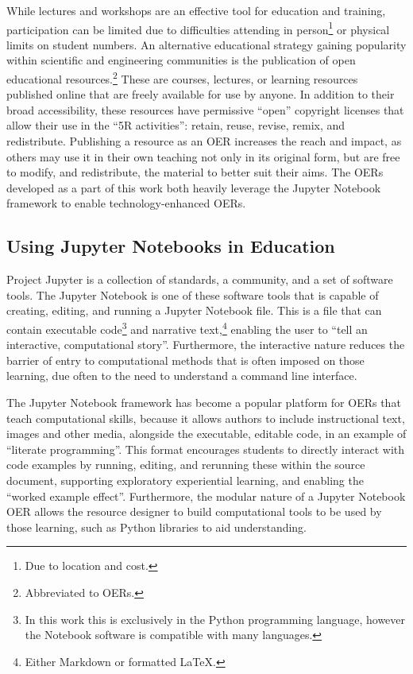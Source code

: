 While lectures and workshops are an effective tool for education and training, participation can be limited due to difficulties attending in person\footnote{Due to location and cost.} or physical limits on student numbers.
An alternative educational strategy gaining popularity within scientific and engineering communities is the publication of open educational resources.\footnote{Abbreviated to OERs.} These are courses, lectures, or learning resources published online that are freely available for use by anyone.
In addition to their broad accessibility, these resources have permissive ``open'' copyright licenses that allow their use in the ``5R activities'': retain, reuse, revise, remix, and redistribute.\autocite{wiley_open_nodate}
Publishing a resource as an OER increases the reach and impact, as others may use it in their own teaching not only in its original form, but are free to modify, and redistribute, the material to better suit their aims.
The OERs developed as a part of this work both heavily leverage the Jupyter Notebook framework\autocite{kluyver_jupyter_2016} to enable technology-enhanced OERs.

\subsection{Using Jupyter Notebooks in Education}
Project Jupyter\autocite{kluyver_jupyter_2016} is a collection of standards, a community, and a set of software tools.
The Jupyter Notebook is one of these software tools that is capable of creating, editing, and running a Jupyter Notebook file.
This is a file that can contain executable code\footnote{In this work this is exclusively in the Python programming language, however the Notebook software is compatible with many languages.} and narrative text,\footnote{Either Markdown or formatted \LaTeX.} enabling the user to ``tell an interactive, computational story''.\autocite{barba_teaching_2019}
Furthermore, the interactive nature reduces the barrier of entry to computational methods that is often imposed on those learning, due often to the need to understand a command line interface.

The Jupyter Notebook framework has become a popular platform for OERs that teach computational skills, because it allows authors to include instructional text, images and other media, alongside the executable, editable code, in an example of ``literate programming''.\autocite{knuth_literate_1984}
This format encourages students to directly interact with code examples by running, editing, and rerunning these within the source document,\autocite{barba_cybertraining_2017} supporting exploratory experiential learning,\autocite{papert_mindstroms_1993} and enabling the ``worked example effect''.\autocite{tarmizi_guidance_1988}
Furthermore, the modular nature of a Jupyter Notebook OER allows the resource designer to build computational tools to be used by those learning, such as Python libraries to aid understanding.

